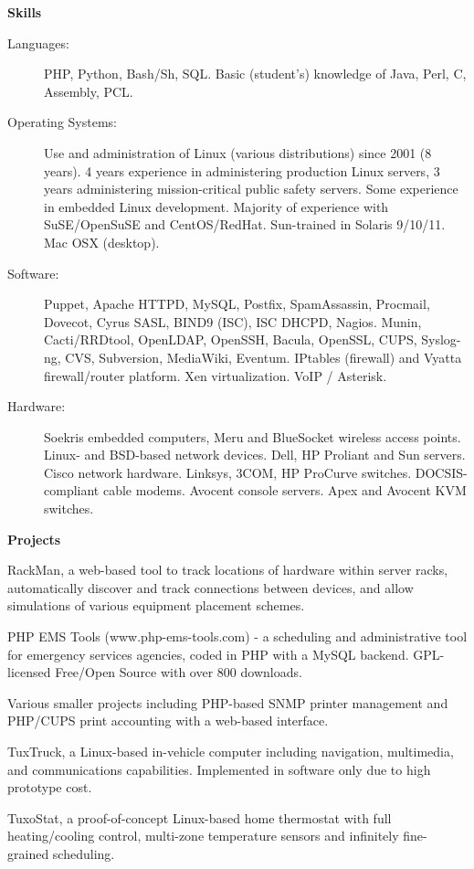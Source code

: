 \documentclass[letterpaper,11pt]{article}
\newcommand{\resheading}[1]{{\large \colorbox{mygrey}{\begin{minipage}{\textwidth}{\textbf{#1 \vphantom{p\^{E}}}}\end{minipage}}}}
\begin{document}
\resheading{Skills}

\begin{description}
\item[Languages:]
PHP, Python, Bash/Sh, SQL. Basic (student's) knowledge of Java, Perl, C, Assembly,
PCL. 
\item[Operating Systems:]
Use and administration of Linux (various distributions) since 2001 (8
years). 4 years experience in administering production Linux servers, 3 years
administering mission-critical public safety servers. Some experience in embedded
Linux development. Majority of experience with SuSE/OpenSuSE and CentOS/RedHat.
Sun-trained in Solaris 9/10/11. Mac OSX (desktop). 
\item[Software:]
Puppet, Apache HTTPD, MySQL, Postfix, SpamAssassin, Procmail, Dovecot, Cyrus SASL, BIND9 (ISC), ISC
DHCPD, Nagios. Munin, Cacti/RRDtool, OpenLDAP, OpenSSH, Bacula,
OpenSSL, CUPS, Syslog-ng, CVS, Subversion, MediaWiki, Eventum. IPtables
(firewall) and Vyatta firewall/router platform. Xen
virtualization. VoIP / Asterisk.
\item[Hardware:]
Soekris embedded computers, Meru and BlueSocket wireless access points. Linux-
and BSD-based network devices. Dell,
HP Proliant and Sun servers. Cisco network hardware. Linksys, 3COM, HP
ProCurve switches. DOCSIS-compliant cable
modems. Avocent console servers. Apex and
Avocent KVM switches.
\end{description}

\resheading{Projects}

\begin{description}
\item[In Progress] RackMan, a web-based tool to track locations of hardware
  within server racks, automatically discover and track connections between
  devices, and allow simulations of various equipment placement schemes.
\item[2007--Present] PHP EMS Tools (www.php-ems-tools.com) - a scheduling and
  administrative tool for emergency services agencies, coded in PHP with a MySQL
  backend. GPL-licensed Free/Open Source with over 800 downloads.
\item Various smaller projects including PHP-based SNMP printer management and
PHP/CUPS print accounting with a web-based interface.
\item TuxTruck, a Linux-based in-vehicle computer including navigation,
  multimedia, and communications capabilities. Implemented in software only
  due to high prototype cost.
\item TuxoStat, a proof-of-concept Linux-based home thermostat with full
  heating/cooling control, multi-zone temperature sensors and infinitely
  fine-grained scheduling.
\end{description}
\end{document}

